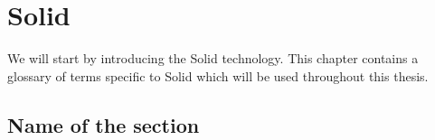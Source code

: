 \chapter{Solid}
We will start by introducing the Solid technology.
This chapter contains a glossary of terms specific to Solid which will be used throughout this thesis.

\section{Name of the section}
